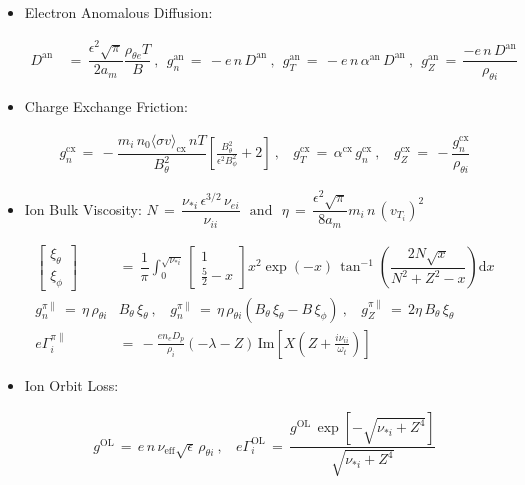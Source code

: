 \documentclass[a4paper,8pt]{article}
\providecommand{\tightlist}{%
  \setlength{\itemsep}{0pt}\setlength{\parskip}{0pt}}
\begin{document}
\begin{itemize}
\tightlist
\item
  Electron Anomalous Diffusion: \small

  \begin{align}
  D^\text{an} \,&=\, \dfrac{\epsilon^2 \sqrt{\pi}}{2 a_m} \dfrac{\rho_{\theta e} T}{B}~,~~ g_n^\text{an} \,=\, -e \,n\, D^\text{an}~,~~ g_T^\text{an} \,=\, -e \,n\, \alpha^\text{an}\, D^\text{an}~,~~ g_Z^\text{an} \,=\, \dfrac{-e \,n\, D^\text{an}}{\rho_{\theta i}}
  \end{align}

  \normalsize
\item
  Charge Exchange Friction: \small

  \begin{align}
  g_n^\text{cx} \,=\, -\dfrac{m_i \,n_0 \langle\sigma v\rangle_\text{cx} \,n T}{B_\theta^2} \left[\frac{B_\theta^2}{\epsilon^2 B_\phi^2} + 2\right]~,~~~~ g_T^\text{cx} \,=\, \alpha^\text{cx}\,g_n^\text{cx}~,~~~~ g_Z^\text{cx} \,=\, -\dfrac{g_n^\text{cx}}{\rho_{\theta i}}
  \end{align}

  \normalsize
\item
  Ion Bulk Viscosity:
  \(N \,=\, \dfrac{\nu_{*i}\,\epsilon^{3/2}\,\nu_{ei}}{\nu_{ii}} ~~~\text{and}~~~ \eta \,=\, \dfrac{\epsilon^2 \sqrt{\pi}}{8 a_m} m_i \,n\, (v_{T_i})^2\)
  \small

  \begin{align}
  \begin{bmatrix}\xi_\theta \\[1ex] \xi_\phi \end{bmatrix} \,&=\, \dfrac{1}{\pi} \int_0^{\sqrt{\nu_{*i}}} \begin{bmatrix} 1 \\[1ex] \frac{5}{2} - x \end{bmatrix} x^2 \exp(-x) \, \tan^{-1}\left(\dfrac{2 N \sqrt{x}}{N^2 + Z^2 - x}\right) \text{d}x \\
  g_n^{\pi\parallel} \,=\, \eta \, \rho_{\theta i}& B_\theta \, \xi_\theta~,~~~~ g_n^{\pi\parallel} \,=\, \eta \, \rho_{\theta i} \left(B_\theta\,\xi_\theta - B\,\xi_\phi\right)~,~~~~ g_Z^{\pi\parallel} \,=\, 2\eta \, B_\theta \, \xi_\theta \\
  e \Gamma_i^{\pi\parallel} \,&=\, -\frac{e n_e D_p}{\rho_i} (-\lambda - Z) \, \text{Im}\left[X\left(Z + \frac{i \nu_{ii}}{\omega_t}\right)\right]
  \end{align}

  \normalsize
\item
  Ion Orbit Loss: \small

  \begin{align}
  g^\text{OL} \,=\, e \,n\, \nu_\text{eff} \sqrt{\epsilon} \,\rho_{\theta i}~,~~~~ e\Gamma_i^\text{OL} \,=\, \dfrac{g^\text{OL}\,\exp\left[-\sqrt{\nu_{*i} + Z^4}\right]}{\sqrt{\nu_{*i} + Z^4}}
  \end{align}

  \normalsize
\end{itemize}
\end{document}
